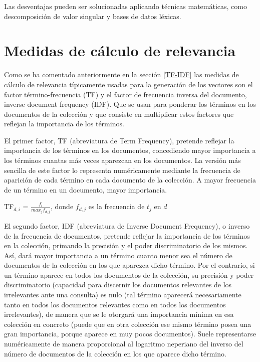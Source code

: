 \documentclass{article}
\begin{document}
Las desventajas pueden ser solucionadas aplicando técnicas matemáticas, como descomposición de valor singular y bases de datos léxicas.

\section{Medidas de cálculo de relevancia}	\label{sec:Medidas de cálculo de relevancia}

Como se ha comentado anteriormente en la sección \ref{TF-IDF} las medidas de cálculo de relevancia típicamente usadas para la generación de los vectores son el factor término-frecuencia (TF) y el factor de frecuencia inversa del documento, inverse document frequency (IDF). Que se usan para ponderar los términos en los documentos de la colección y que consiste en multiplicar estos factores que reflejan la importancia de los términos.

El primer factor, TF (abreviatura de Term Frequency), pretende reflejar la importancia de los términos en los documentos, concediendo mayor importancia a los términos cuantas más veces aparezcan en los documentos. La versión más sencilla de este factor lo representa numéricamente mediante la frecuencia de aparición de cada término en cada documento de la colección. A mayor frecuencia de un término en un documento, mayor
importancia.

\begin{center}
	TF$_{d, i}$ = $\frac{f_{i}}{max_{j} f_{d, j}}$, 
	donde $f_{d, j}$ es la frecuencia de $t_{j}$ en $d$
\end{center}

El segundo factor, IDF (abreviatura de Inverse Document Frequency), o inverso de la frecuencia de documentos, pretende reflejar la importancia de los términos en la colección, primando la precisión y el poder discriminatorio de los mismos. Así, dará mayor importancia a un término cuanto menor sea el número de documentos de la colección en los que aparezca dicho término. Por el contrario, si un término aparece en todos los documentos de la colección, su precisión y poder discriminatorio (capacidad para discernir los documentos relevantes de los irrelevantes ante una consulta) es nulo (tal término aparecerá necesariamente tanto en todos los documentos relevantes como en todos los documentos irrelevantes), de manera que se le otorgará una importancia mínima en esa colección en concreto (puede que en otra colección ese mismo término posea una gran importancia, porque aparece en muy pocos documentos). Suele representarse numéricamente de manera proporcional al logaritmo neperiano del inverso del número de documentos de la colección en los que aparece dicho término.
\end{document}
